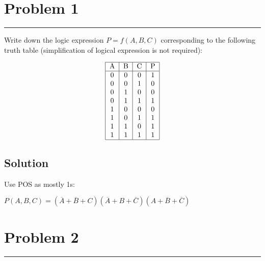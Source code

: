 \documentclass{article}
\begin{document}
\newcommand{\documentcourse}{COMP2120}
\newcommand{\documentnumber}{1}





\section*{Problem 1}
\hrule
\vspace{0.5cm}

Write down the logic expression $P = f (A, B, C)$ corresponding to the following truth table (simplification of
logical expression is not required):

\[
    \begin{tabular}{|c|c|c|c|}
        \hline
        \text{A} & \text{B} & \text{C} & \text{P} \\
        \hline
        0        & 0        & 0        & 1        \\
        0        & 0        & 1        & 0        \\
        0        & 1        & 0        & 0        \\
        0        & 1        & 1        & 1        \\
        1        & 0        & 0        & 0        \\
        1        & 0        & 1        & 1        \\
        1        & 1        & 0        & 1        \\
        1        & 1        & 1        & 1        \\
        \hline
    \end{tabular}
\]

\subsection*{Solution}

Use POS as mostly 1s:

$P(A,B,C)=(\overline{A} + \overline{B} + C)(\overline{A} + B + \overline{C})(A + \overline{B} + \overline{C})$

\section*{Problem 2}
\hrule
\vspace{0.5cm}
\end{document}
